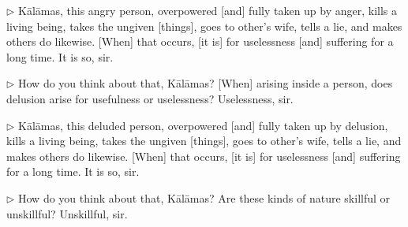 \addtocounter{sennum}{-2}
$\triangleright$  K\=al\=amas, this angry person, overpowered [and] fully taken up by anger, kills a living being, takes the ungiven [things], goes to other's wife, tells a lie, and makes others do likewise. [When] that occurs, [it is] for uselessness [and] suffering  for a long time.  It is so, sir.\\


\addtocounter{sennum}{-2}
$\triangleright$  How do you think about that, K\=al\=amas? [When] arising inside a person, does delusion arise for usefulness or uselessness?  Uselessness, sir.\\


\addtocounter{sennum}{-2}
$\triangleright$  K\=al\=amas, this deluded person, overpowered [and] fully taken up by delusion, kills a living being, takes the ungiven [things], goes to other's wife, tells a lie, and makes others do likewise. [When] that occurs, [it is] for uselessness [and] suffering  for a long time.  It is so, sir.\\


\addtocounter{sennum}{-2}
$\triangleright$  How do you think about that, K\=al\=amas? Are these kinds of nature skillful or unskillful?  Unskillful, sir.\\

